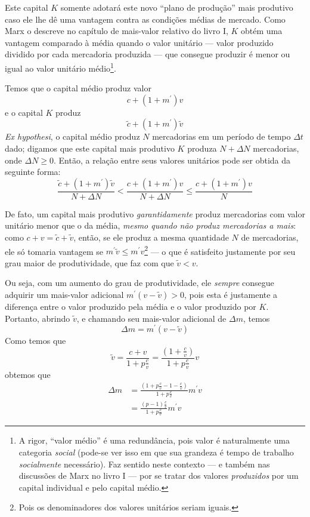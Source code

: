 Este capital $K$ somente adotará este novo ``plano de produção'' mais produtivo caso ele lhe dê uma vantagem contra as condições médias de mercado. Como Marx o descreve no capítulo de mais-valor relativo do livro I, $K$ obtém uma vantagem comparado à média quando o valor unitário — valor produzido dividido por cada mercadoria produzida — que consegue produzir é menor ou igual ao valor unitário médio\footnote{A rigor, ``valor médio'' é uma redundância, pois valor é naturalmente uma categoria \textit{social} (pode-se ver isso em que sua grandeza é tempo de trabalho \textit{socialmente} necessário). Faz sentido neste contexto — e também nas discussões de Marx no livro I — por se tratar dos valores \textit{produzidos} por um capital individual e pelo capital médio.}. 

Temos que o capital médio produz valor
$$
c + (1+m^{\prime})v
$$
e o capital $K$ produz
$$
\tilde{c}+(1+m^{\prime})\tilde{v}
$$
\textit{Ex hypothesi}, o capital médio produz $N$ mercadorias em um período de tempo $\Delta t$ dado; digamos que este capital mais produtivo $K$ produza $N+\Delta N$ mercadorias, onde $\Delta N \geq 0$. Então, a relação entre seus valores unitários pode ser obtida da seguinte forma: 
$$
\frac{\tilde{c} + (1+m^{\prime})\tilde{v}}{N+\Delta N} < \frac{c+(1+m^{\prime})v}{N+\Delta N} \leq \frac{c+(1+m^{\prime})v}{N}
$$

De fato, um capital mais produtivo \textit{garantidamente} produz mercadorias com valor unitário menor que o da média, \textit{mesmo quando não produz mercadorias a mais}: como $c+v = \tilde{c}+\tilde{v}$, então, se ele produz a mesma quantidade $N$ de mercadorias, ele só tomaria vantagem se $m^{\prime}\tilde{v} \leq m^{\prime}v$\footnote{Pois os denominadores dos valores unitários seriam iguais.} — o que é satisfeito justamente por seu grau maior de produtividade, que faz com que $\tilde{v} < v$. 

Ou seja, com um aumento do grau de produtividade, ele \textit{sempre} consegue adquirir um mais-valor adicional $m^{\prime}(v-\tilde{v}) > 0$, pois esta é justamente a diferença entre o valor produzido pela média e o valor produzido por $K$. Portanto, abrindo $\tilde{v}$, e chamando seu mais-valor adicional de $\Delta m$, temos
$$
\Delta m = m^{\prime}(v-\tilde{v})
$$
Como temos que 
$$
\tilde{v} = \frac{c+v}{1+p \frac{c}{v}} = \frac{\left( 1+\frac{c}{v} \right)}{1+p \frac{c}{v}} v
$$
obtemos que
\begin{align*}
\Delta m &=\frac{\left( 1 + p \frac{c}{v} - 1 - \frac{c}{v} \right)}{1+p \frac{c}{v}} m^{\prime}v \\
&= \frac{(p-1) \frac{c}{v}}{1+ p \frac{c}{v}} m^{\prime}v
\end{align*}

